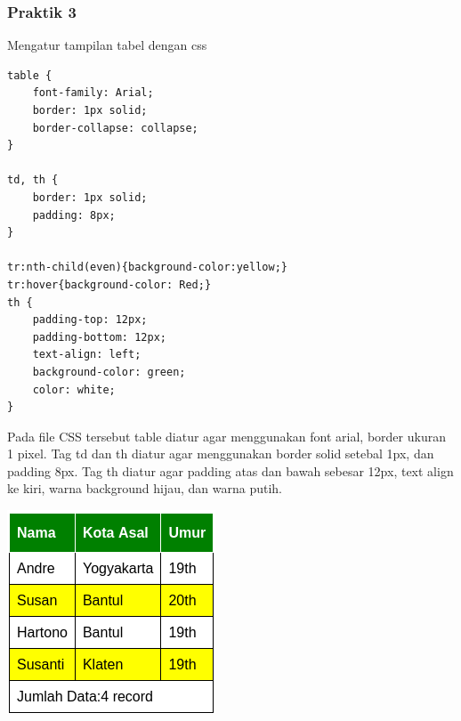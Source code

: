 \documentclass[a4paper,12pt]{article}
\begin{document}
\subsubsection{Praktik 3}
Mengatur tampilan tabel dengan css
\begin{lstlisting} 
table {
    font-family: Arial;
    border: 1px solid;
    border-collapse: collapse;
}

td, th {
    border: 1px solid;
    padding: 8px;
}

tr:nth-child(even){background-color:yellow;}
tr:hover{background-color: Red;}
th {
    padding-top: 12px;
    padding-bottom: 12px;
    text-align: left;
    background-color: green;
    color: white;
}
\end{lstlisting}

Pada file CSS tersebut table diatur agar menggunakan font arial, border ukuran 1 pixel. Tag td dan th diatur agar
menggunakan border solid setebal 1px, dan padding 8px. Tag th diatur agar padding atas dan bawah sebesar 12px, text
align ke kiri, warna background hijau, dan warna putih.

\begin{center}
    \includegraphics[scale=.7]{4.png} 
\end{center}

\newpage
\end{document}
